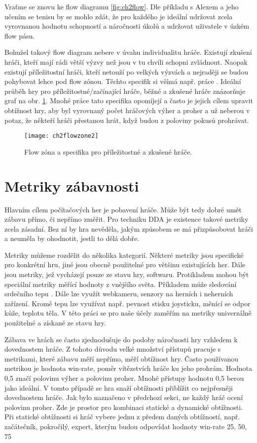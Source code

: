 Vraťme se znovu ke flow diagramu \ref{fig:ch2flow}. Dle příkladu s Alexem a jeho učením se tenisu by se mohlo zdát, že pro každého je ideální udržovat zcela vyrovnanou hodnotu schopností a náročnosti úkolů a udržovat uživatele v úzkém flow pásu.

Bohužel takový flow diagram nebere v úvahu individualitu hráče. Existují zkušení hráči, kteří mají rádi větší výzvy než jsou v tu chvíli schopni zvládnout. Naopak existují příležitostní hráči, kteří netouží po velkých výzvách a nejraději se budou pohybovat lehce pod flow zónou. Těchto specifik si všímá např. práce \cite{RiskTakers}. Ideální průběh hry pro příležitostné/začínající hráče, běžné a zkušené hráče znázorňuje graf na obr. \ref{fig:ch2flowzone2}. Mnohé práce tato specifika opomíjejí a často je jejich cílem upravit obtížnost hry, aby byl vyrovnaný počet hráčových výher a proher a už neberou v potaz, že někteří hráči přestanou hrát, když budou z poloviny pokusů prohrávat.

\begin{figure}
  \centering
  \texttt{[image: ch2flowzone2]}
	\caption{Flow zóna a specifika pro příležitostné a zkušené hráče. }
	\label{fig:ch2flowzone2}
\end{figure}	

\section{Metriky zábavnosti} \label{sec:defzab}

Hlavním cílem počítačových her je pobavení hráče. Může být tedy dobré umět zábavu přímo, či nepřímo změřit. Pro techniku DDA je existence takové metriky zcela zásadní. Bez ní by hra nevěděla, jakým způsobem se má přizpůsobovat hráči a neuměla by ohodnotit, jestli to dělá dobře. 

Metriky můžeme rozdělit do několika kategorií. Některé metriky jsou specifické pro konkrétní hru, jiné jsou obecně použitelné pro většinu existujících her. Dále jsou metriky, jež vycházejí pouze ze stavu hry, softwaru. Protikladem mohou být speciální metriky měřící hodnoty z vnějšího světa. Příkladem může sledování srdečního tepu \cite{7}. Dále lze využít webkameru, senzory na herních i neherních zařízení. Kromě tepu lze využívat např. pevnost stisku joysticku, měnící se odpor kůže, teplotu těla.\cite{16Survey} V této práci se pro naše účely zaměřím na metriky univerzálně použitelné a získané ze stavu hry.

Zábava ve hrách se často zjednodušuje do podoby náročnosti hry vzhledem k dovednostem hráče. Z tohoto důvodu velké množství přístupů pracuje s metrikami, které zábavu měří nepřímo, měří obtížnost hry. Často používanou metrikou je hodnota win-rate, poměr vítězstvích hráče ku jeho prohrám. Hodnota 0,5 značí polovinu výher a polovinu proher. Mnohé přístupy hodnotu 0,5 berou jako ideální. V tomto případě se hra snaží obtížnosti přiblížit co nejpřesněji dovednostem hráče. Jak bylo naznačeno v předchozí sekci, ne každý hráč ocení polovinu proher. Zde je prostor pro kombinaci statické a dynamické obtížnosti. Při statické obtížnosti si hráč vybere jednu z předem daných obtížností, např. začátečník, pokročilý, expert, kterým budou odpovídat hodnoty win-rate 25, 50, 75 %

